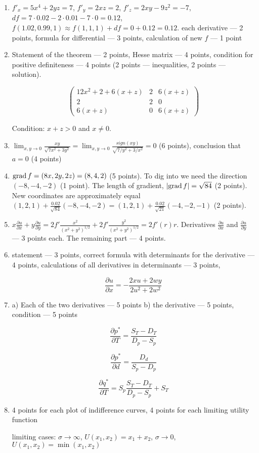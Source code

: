 \begin{enumerate}
\item $f'_x=5x^4+2yz=7$, $f'_y=2xz=2$, $f'_z=2xy-9z^2=-7$, $df=7\cdot 0.02-2\cdot 0.01-7\cdot 0=0.12$, $f(1.02,0.99,1)\approx f(1,1,1)+df=0+0.12=0.12$.
each derivative --- 2 points, formula for differential --- 3 points, calculation of new $f$ --- 1 point

\item  Statement of the theorem --- 2 points, Hesse matrix --- 4 points, condition for positive definiteness --- 4 points (2 points --- inequalities, 2 points --- solution).

\[
\begin{pmatrix}
12x^2+2+6(x+z) & 2 & 6(x+z) \\
2 & 2 & 0 \\
6(x+z) & 0 & 6(x+z)
\end{pmatrix}
\]

Condition: $x+z>0$ and $x\neq 0$.


\item $\lim_{x,y\to 0} \frac{xy}{\sqrt{7x^2+3y^2}}=\lim_{x,y\to 0} \frac{sign(xy)}{\sqrt{7/y^2+3/x^2}}=0$ (6 points), conclusion that $a=0$ (4 points)
\item $\mathrm{grad}\, f=(8x, 2y, 2z)=(8, 4, 2)$ (5 points). To dig into we need the direction $(-8, -4,-2)$ (1 point). The length of gradient, $|\mathrm{grad}\, f| = \sqrt{84}$ (2 points). New coordinates are approximately equal $(1,2,1)+\frac{0.02}{\sqrt{84}}(-8,-4,-2)=(1,2,1)+\frac{0.02}{\sqrt{21}}(-4,-2,-1)$ (2 points).

\item $x\frac{\partial u}{\partial x}+y\frac{\partial u}{\partial y}=2f'\frac{x^2}{(x^2+y^2)^{1/2}}+2f'\frac{y^2}{(x^2+y^2)^{1/2}}=2f'(r)r$. Derivatives $\frac{\partial u}{\partial x}$ and $\frac{\partial u}{\partial y}$ --- 3 points each. The remaining part --- 4 points.

\item statement --- 3 points, correct formula with determinants for the derivative --- 4 points, calculations of all derivatives in determinants --- 3 points,

\[
\frac{\partial u}{\partial x}=- \frac{2xu+2wy}{2u^2+2w^2}
\]

\item a) Each of the two derivatives --- 5 points b) the derivative --- 5 points, condition --- 5 points

\[
\frac{\partial p^*}{\partial T}=\frac{S_T-D_T}{D_p-S_p}
\]

\[
\frac{\partial p^*}{\partial d}=\frac{D_d}{S_p-D_p}
\]

\[
\frac{\partial q^*}{\partial T}=S_p\frac{S_T-D_T}{D_p-S_p}+S_T
\]

\item 4 points for each plot of indifference curves, 4 points for each limiting utility function

limiting cases: $\sigma\to\infty$, $U(x_1,x_2)=x_1+x_2$, $\sigma\to 0$, $U(x_1,x_2)=\min(x_1,x_2)$


\end{enumerate}



